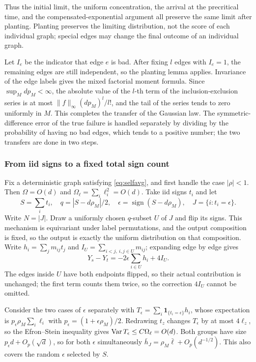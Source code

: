 Thus the initial limit, the uniform concentration, the arrival at the precritical time, and the
compensated-exponential argument all preserve the same limit after planting. Planting preserves the limiting
distribution, not the score of each individual graph; special edges may change the final outcome of an
individual graph.

Let $I_e$ be the indicator that edge $e$ is bad. After fixing $l$ edges with $I_e=1$, the remaining edges are
still independent, so the planting lemma applies. Invariance of the edge labels gives the mixed factorial
moment formula. Since $\sup_M dp_M<\infty$, the absolute value of the $l$-th term of the inclusion-exclusion
series is at most $\|f\|_\infty (dp_M)^l/l!$, and the tail of the series tends to zero uniformly in $M$. This
completes the transfer of the Gaussian law. The symmetric-difference error of the true failure is handled
separately by dividing by the probability of having no bad edges, which tends to a positive number; the two
transfers are done in two steps.

\subsubsection{From iid signs to a fixed total sign count}
Fix a deterministic graph satisfying \eqref{eq:selfavg}, and first handle the case $|\rho|<1$. Then
$\Omega=O(d)$ and $\Omega_\ell=\sum_i\ell_i^2=O(d)$. Take iid signs $t_i$ and let
\[
S=\sum_i t_i,\quad q=|S-d\rho_M|/2,\quad
\epsilon=\operatorname{sign}(S-d\rho_M),\quad J=\{i:t_i=\epsilon\}.
\]
Write $N=|J|$. Draw a uniformly chosen $q$-subset $U$ of $J$ and flip its signs. This mechanism is
equivariant under label permutations, and the output composition is fixed, so the output is exactly the
uniform distribution on that composition. Write $h_i=\sum_jm_{ij}t_j$ and
$I_U=\sum_{i<j,\ i,j\in U}m_{ij}$; expanding edge by edge gives
\[
Y_s-Y_t=-2\epsilon\sum_{i\in U}h_i+4I_U.\label{eq:batchflip}
\]
The edges inside $U$ have both endpoints flipped, so their actual contribution is unchanged; the first term
counts them twice, so the correction $4I_U$ cannot be omitted.

Consider the two cases of $\epsilon$ separately with $T_\epsilon=\sum_i\mathbf1_{\{t_i=\epsilon\}}h_i$, whose
expectation is $p_\epsilon\rho_M\sum_i \ell_i$ with $p_\epsilon=(1+\epsilon\rho_M)/2$. Redrawing $t_z$ changes
$T_\epsilon$ by at most $4\ell_z$, so the Efron--Stein inequality gives $\operatorname{Var} T_\epsilon\le
C\Omega_\ell=O(d)$. Both groups have size $p_\epsilon d+O_p(\sqrt d)$, so for both $\epsilon$ simultaneously
$\bar h_J=\rho_M\bar\ell+O_p(d^{-1/2})$. This also covers the random $\epsilon$ selected by $S$.

